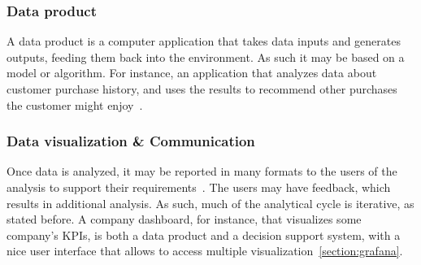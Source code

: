 \subsubsection{Data product}
A data product is a computer application that takes data inputs and generates outputs, feeding them back into the environment.
As such it may be based on a model or algorithm. For instance, an application that analyzes data about customer purchase history, and uses the results to recommend other purchases the customer might enjoy~\cite{Book:doing_data_science}.

\subsubsection{Data visualization \& Communication}
Once data is analyzed, it may be reported in many formats to the users of the analysis to support their requirements~\cite{Article:intro_to_data_analysis}.
The users may have feedback, which results in additional analysis. As such, much of the analytical cycle is iterative, as stated before.
A company dashboard, for instance, that visualizes some company's \ac{KPIs}, is both a data product and a decision support system, with a nice user interface that allows  to access multiple visualization~\ref{section:grafana}.

